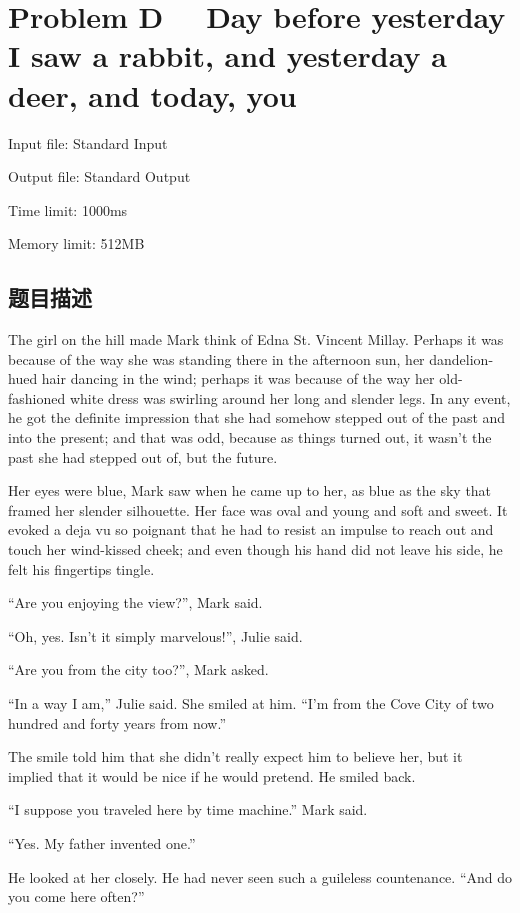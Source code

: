 \newpage
\section{Problem D \ \ Day before yesterday I saw a rabbit, and yesterday a deer, and today, you}
{ \limitfont{}
Input file: Standard Input \par
Output file: Standard Output \par
Time limit: 1000ms \par
Memory limit: 512MB \par
}
\subsection*{题目描述}
The girl on the hill made Mark think of Edna St. Vincent Millay. Perhaps it was because of the way she was standing there in the afternoon sun, her dandelion-hued hair dancing in the wind; perhaps it was because of the way her old-fashioned white dress was swirling around her long and slender legs. In any event, he got the definite impression that she had somehow stepped out of the past and into the present; and that was odd, because as things turned out, it wasn't the past she had stepped out of, but the future.

Her eyes were blue, Mark saw when he came up to her, as blue as the sky that framed her slender silhouette. Her face was oval and young and soft and sweet. It evoked a deja vu so poignant that he had to resist an impulse to reach out and touch her wind-kissed cheek; and even though his hand did not leave his side, he felt his fingertips tingle.

``Are you enjoying the view?'', Mark said.

``Oh, yes. Isn't it simply marvelous!'', Julie said.

``Are you from the city too?'', Mark asked.

``In a way I am,'' Julie said. She smiled at him. ``I'm from the Cove City of two hundred and forty years from now.''

The smile told him that she didn't really expect him to believe her, but it implied that it would be nice if he would pretend. He smiled back.

``I suppose you traveled here by time machine.'' Mark said.

``Yes. My father invented one.''

He looked at her closely. He had never seen such a guileless countenance. ``And do you come here often?''

